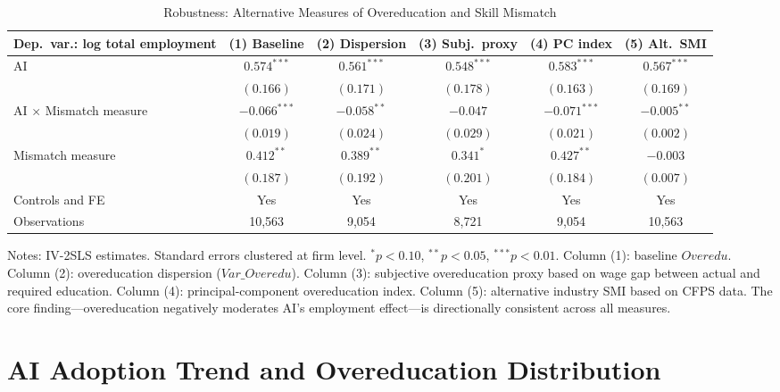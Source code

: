 \documentclass[12pt,a4paper]{article}
\theoremstyle{predstyle}
\theoremstyle{plain}
\newcommand{\Overedu}{\mathit{Overedu}}
\begin{document}
\begin{appendices}
\begin{table}[H]
\centering
\caption{Robustness: Alternative Measures of Overeducation and Skill Mismatch}
\label{tab:altmismatch}
\begin{threeparttable}
\scriptsize
\setlength{\tabcolsep}{4pt}
\begin{tabular}{lccccc}
\toprule
Dep.\ var.: log total employment & (1) Baseline & (2) Dispersion & (3) Subj.\ proxy & (4) PC index & (5) Alt.\ SMI \\
\midrule
AI & \(0.574^{***}\) & \(0.561^{***}\) & \(0.548^{***}\) & \(0.583^{***}\) & \(0.567^{***}\) \\
 & \((0.166)\) & \((0.171)\) & \((0.178)\) & \((0.163)\) & \((0.169)\) \\
AI \(\times\) Mismatch measure & \(-0.066^{***}\) & \(-0.058^{**}\) & \(-0.047\) & \(-0.071^{***}\) & \(-0.005^{**}\) \\
 & \((0.019)\) & \((0.024)\) & \((0.029)\) & \((0.021)\) & \((0.002)\) \\
Mismatch measure & \(0.412^{**}\) & \(0.389^{**}\) & \(0.341^{*}\) & \(0.427^{**}\) & \(-0.003\) \\
 & \((0.187)\) & \((0.192)\) & \((0.201)\) & \((0.184)\) & \((0.007)\) \\
Controls and FE & Yes & Yes & Yes & Yes & Yes \\
\midrule
Observations & 10,563 & 9,054 & 8,721 & 9,054 & 10,563 \\
\bottomrule
\end{tabular}
\begin{tablenotes}
\footnotesize
\item Notes: IV-2SLS estimates. Standard errors clustered at firm level. \(^{*}p<0.10\), \(^{**}p<0.05\), \(^{***}p<0.01\). Column (1): baseline \(\Overedu\). Column (2): overeducation dispersion (\(Var\_\Overedu\)). Column (3): subjective overeducation proxy based on wage gap between actual and required education. Column (4): principal-component overeducation index. Column (5): alternative industry SMI based on CFPS data. The core finding---overeducation negatively moderates AI's employment effect---is directionally consistent across all measures.
\end{tablenotes}
\end{threeparttable}
\end{table}

\section{AI Adoption Trend and Overeducation Distribution}
\label{app:figures}


\end{appendices}
\end{document}
